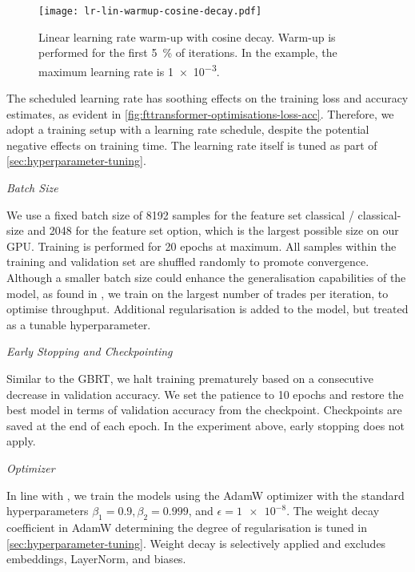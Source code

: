 \begin{figure}[!ht]
    \centering
    \texttt{[image: lr-lin-warmup-cosine-decay.pdf]}
    \caption[Linear Learning Rate Warm-Up With Cosine Decay]{Linear learning rate warm-up with cosine decay. Warm-up is performed for the first \SI{5}{\percent} of iterations. In the example, the maximum learning rate is \num{1e-3}.}
    \label{fig:lr-lin-warmup-cosine-decay}
\end{figure}

The scheduled learning rate has soothing effects on the training loss and accuracy estimates, as evident in \cref{fig:fttransformer-optimisations-loss-acc}. Therefore, we adopt a training setup with a learning rate schedule, despite the potential negative effects on training time. The learning rate itself is tuned as part of \cref{sec:hyperparameter-tuning}.


\emph{Batch Size}

We use a fixed batch size of \num{8192} samples for the feature set classical / classical-size and \num{2048} for the feature set option, which is the largest possible size on our \gls{GPU}. Training is performed for \num{20} epochs at maximum. All samples within the training and validation set are shuffled randomly to promote convergence. Although a smaller batch size could enhance the generalisation capabilities of the model, as found in \textcite[][3]{keskarLargeBatchTrainingDeep2017}, we train on the largest number of trades per iteration, to optimise throughput. Additional regularisation is added to the model, but treated as a tunable hyperparameter.

\emph{Early Stopping and Checkpointing}

Similar to the \gls{GBRT}, we halt training prematurely based on a consecutive decrease in validation accuracy. We set the patience to \num{10} epochs and restore the best model in terms of validation accuracy from the checkpoint. Checkpoints are saved at the end of each epoch. In the experiment above, early stopping does not apply.

\emph{Optimizer}

In line with \textcite[][6]{gorishniyRevisitingDeepLearning2021}, we train the models using the AdamW optimizer \autocite[][2--3]{loshchilovDecoupledWeightDecay2019} with the standard hyperparameters $\beta_{1}=0.9, \beta_{2}=0.999$, and $\epsilon = \num{1e-8}$. The weight decay coefficient in AdamW determining the degree of regularisation is tuned in \cref{sec:hyperparameter-tuning}. Weight decay is selectively applied and excludes embeddings, LayerNorm, and biases.

